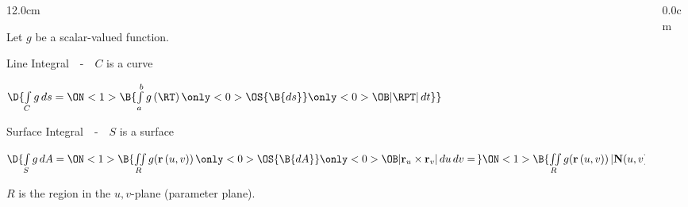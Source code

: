 \begin{frame}
\begin{columns}\begin{column}{12.0cm}
\scriptsize

\vspace{0.2cm}

Let $g$ be a scalar-valued function.

\vspace{0.7cm}

Line Integral \,\, - \,\, $C$ is a curve

\begin{center}
	$\D{\int \limits_{C} g \, ds = 
	\ON<1>{\B{\int \limits_{a}^{b} g\,(\RT)\, 
	\only<0>{\OS{\B{ ds }}}{
	\only<0>{\OB}{ |\RPT| \, dt }}}}}$
\end{center}

\vspace{0.2cm}

Surface Integral \,\, - \,\, $S$ is a surface

\begin{center}
	$\D{\int \limits_{S} g \, dA = 
	\ON<1>{\B{\iint \limits_{R} g({\bf r}\,(u,v)) \, \only<0>{\OS{\B{ dA }}}{\only<0>{\OB}{ |{\bf r}_u \times {\bf r}_v| \, du \, dv }} = \,}}
	\ON<1>{\B{\iint \limits_{R} g({\bf r}\,(u,v)) \, |{\bf N}(u,v)| \, du \, dv}}}$
\end{center}

\vspace{0.5cm}

$R$ is the region in the $u,v$-plane (parameter plane).

\vspace{1.2cm}

\end{column}\begin{column}{0.0cm}\end{column}\end{columns}
\end{frame}

